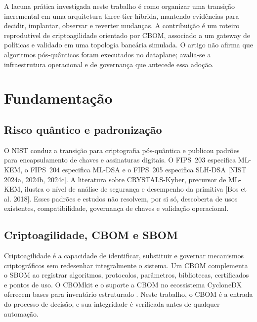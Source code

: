 \documentclass[12pt]{article}
\newcommand{\sbcshortcite}[2]{[#1]\nocite{#2}}
\begin{document}
A lacuna pr\'atica investigada neste trabalho \'e como organizar uma transi\c{c}\~ao incremental em uma arquitetura three-tier h\'ibrida, mantendo evid\^encias para decidir, implantar, observar e reverter mudan\c{c}as. A contribui\c{c}\~ao \'e um roteiro reprodut\'ivel de criptoagilidade orientado por CBOM, associado a um gateway de pol\'iticas e validado em uma topologia banc\'aria simulada. O artigo n\~ao afirma que algoritmos p\'os-qu\^anticos foram executados no dataplane; avalia-se a infraestrutura operacional e de governan\c{c}a que antecede essa ado\c{c}\~ao.

\section{Fundamenta\c{c}\~ao}
\subsection{Risco qu\^antico e padroniza\c{c}\~ao}
O NIST conduz a transi\c{c}\~ao para criptografia p\'os-qu\^antica e publicou padr\~oes para encapsulamento de chaves e assinaturas digitais. O FIPS~203 especifica ML-KEM, o FIPS~204 especifica ML-DSA e o FIPS~205 especifica SLH-DSA \sbcshortcite{NIST 2024a, 2024b, 2024c}{fips203,fips204,fips205}. A literatura sobre CRYSTALS-Kyber, precursor de ML-KEM, ilustra o n\'ivel de an\'alise de seguran\c{c}a e desempenho da primitiva \sbcshortcite{Bos et al. 2018}{bos2018}. Esses padr\~oes e estudos n\~ao resolvem, por si s\'o, descoberta de usos existentes, compatibilidade, governan\c{c}a de chaves e valida\c{c}\~ao operacional.

\subsection{Criptoagilidade, CBOM e SBOM}
Criptoagilidade \'e a capacidade de identificar, substituir e governar mecanismos criptogr\'aficos sem redesenhar integralmente o sistema. Um CBOM complementa o SBOM ao registrar algoritmos, protocolos, par\^ametros, bibliotecas, certificados e pontos de uso. O CBOMkit e o suporte a CBOM no ecossistema CycloneDX oferecem bases para invent\'ario estruturado \cite{ibm-cbom,cbomkit,cyclonedx-cbom}. Neste trabalho, o CBOM \'e a entrada do processo de decis\~ao, e sua integridade \'e verificada antes de qualquer automa\c{c}\~ao.
\end{document}
